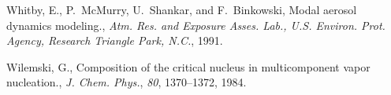 Whitby, E., P.~McMurry, U.~Shankar, and F.~Binkowski, Modal aerosol dynamics
  modeling., {\it Atm. Res. and Exposure Asses. Lab., U.S. Environ. Prot.
  Agency, Research Triangle Park, N.C.\/}, 1991.

Wilemski, G., Composition of the critical nucleus in multicomponent vapor
  nucleation., {\it J. Chem. Phys.\/}, {\it 80\/}, 1370--1372, 1984.



%

